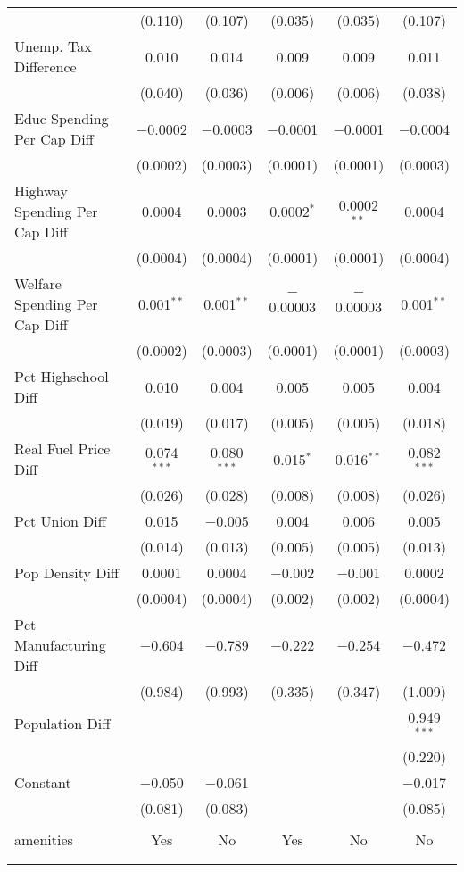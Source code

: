 \begin{table}[!htbp]
\begin{tabular}{@{\extracolsep{5pt}}lccccc}
  & (0.110) & (0.107) & (0.035) & (0.035) & (0.107) \\ 
  Unemp. Tax Difference & 0.010 & 0.014 & 0.009 & 0.009 & 0.011 \\ 
  & (0.040) & (0.036) & (0.006) & (0.006) & (0.038) \\ 
  Educ Spending Per Cap Diff & $-$0.0002 & $-$0.0003 & $-$0.0001 & $-$0.0001 & $-$0.0004 \\ 
  & (0.0002) & (0.0003) & (0.0001) & (0.0001) & (0.0003) \\ 
  Highway Spending Per Cap Diff & 0.0004 & 0.0003 & 0.0002$^{*}$ & 0.0002$^{**}$ & 0.0004 \\ 
  & (0.0004) & (0.0004) & (0.0001) & (0.0001) & (0.0004) \\ 
  Welfare Spending Per Cap Diff & 0.001$^{**}$ & 0.001$^{**}$ & $-$0.00003 & $-$0.00003 & 0.001$^{**}$ \\ 
  & (0.0002) & (0.0003) & (0.0001) & (0.0001) & (0.0003) \\ 
  Pct Highschool Diff & 0.010 & 0.004 & 0.005 & 0.005 & 0.004 \\ 
  & (0.019) & (0.017) & (0.005) & (0.005) & (0.018) \\ 
  Real Fuel Price Diff & 0.074$^{***}$ & 0.080$^{***}$ & 0.015$^{*}$ & 0.016$^{**}$ & 0.082$^{***}$ \\ 
  & (0.026) & (0.028) & (0.008) & (0.008) & (0.026) \\ 
  Pct Union Diff & 0.015 & $-$0.005 & 0.004 & 0.006 & 0.005 \\ 
  & (0.014) & (0.013) & (0.005) & (0.005) & (0.013) \\ 
  Pop Density Diff & 0.0001 & 0.0004 & $-$0.002 & $-$0.001 & 0.0002 \\ 
  & (0.0004) & (0.0004) & (0.002) & (0.002) & (0.0004) \\ 
  Pct Manufacturing Diff & $-$0.604 & $-$0.789 & $-$0.222 & $-$0.254 & $-$0.472 \\ 
  & (0.984) & (0.993) & (0.335) & (0.347) & (1.009) \\ 
  Population Diff &  &  &  &  & 0.949$^{***}$ \\ 
  &  &  &  &  & (0.220) \\ 
  Constant & $-$0.050 & $-$0.061 &  &  & $-$0.017 \\ 
  & (0.081) & (0.083) &  &  & (0.085) \\ 
 \hline \\[-1.8ex] 
amenities & Yes & No & Yes & No & No \\ 
\hline \\[-1.8ex] 
\hline 
\hline \\[-1.8ex] 
\end{tabular} 
\end{table} 
